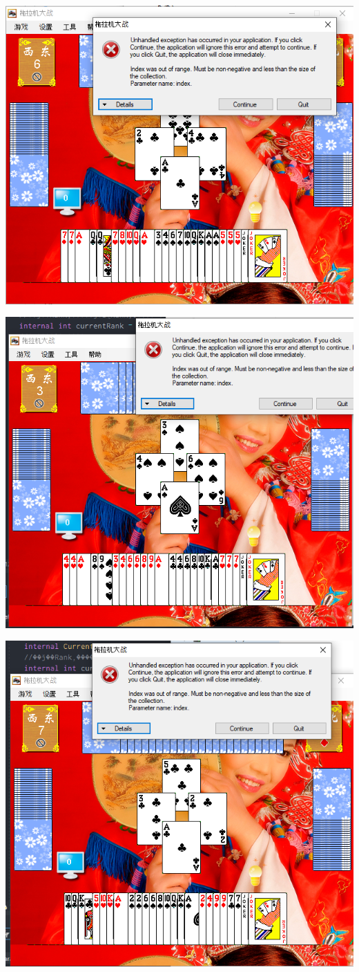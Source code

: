 \documentclass[9pt, b5paper]{article}
\begin{document}
\includegraphics[width=.9\linewidth]{./pic/readme_20230509_230111.png}

\includegraphics[width=.9\linewidth]{./pic/readme_20230509_232252.png}

\includegraphics[width=.9\linewidth]{./pic/readme_20230510_014418.png}
\end{document}
